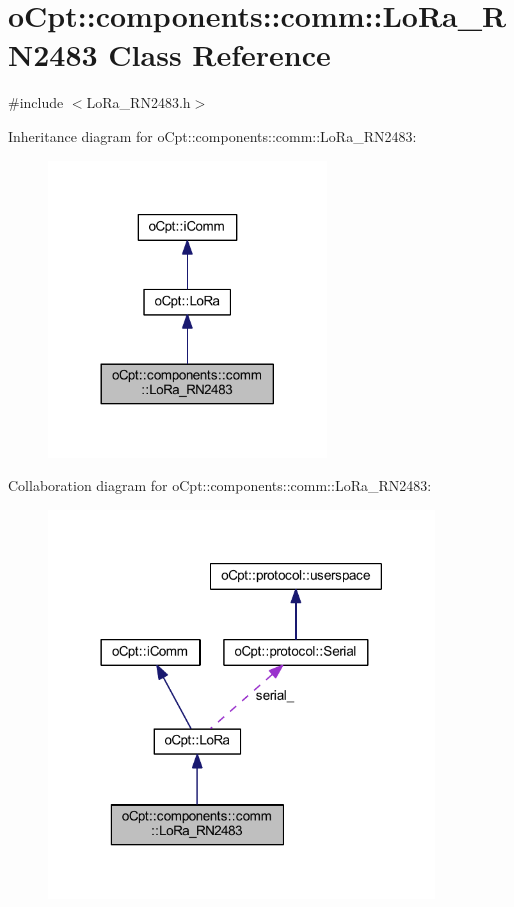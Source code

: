 \hypertarget{classo_cpt_1_1components_1_1comm_1_1_lo_ra___r_n2483}{}\section{o\+Cpt\+:\+:components\+:\+:comm\+:\+:Lo\+Ra\+\_\+\+R\+N2483 Class Reference}
\label{classo_cpt_1_1components_1_1comm_1_1_lo_ra___r_n2483}


{\ttfamily \#include $<$Lo\+Ra\+\_\+\+R\+N2483.\+h$>$}



Inheritance diagram for o\+Cpt\+:\+:components\+:\+:comm\+:\+:Lo\+Ra\+\_\+\+R\+N2483\+:\nopagebreak
\begin{figure}[H]
\begin{center}
\leavevmode
\includegraphics[width=209pt]{classo_cpt_1_1components_1_1comm_1_1_lo_ra___r_n2483__inherit__graph}
\end{center}
\end{figure}


Collaboration diagram for o\+Cpt\+:\+:components\+:\+:comm\+:\+:Lo\+Ra\+\_\+\+R\+N2483\+:\nopagebreak
\begin{figure}[H]
\begin{center}
\leavevmode
\includegraphics[width=290pt]{classo_cpt_1_1components_1_1comm_1_1_lo_ra___r_n2483__coll__graph}
\end{center}
\end{figure}
